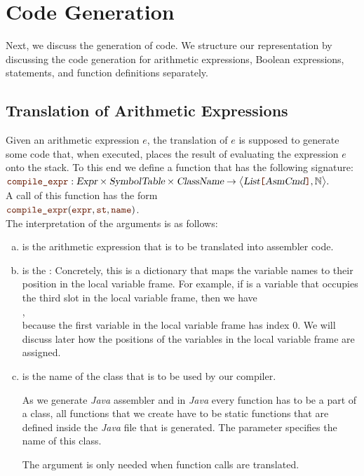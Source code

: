 \section{Code Generation}
Next, we discuss the generation of code.  We structure our representation by discussing the code generation for
arithmetic expressions, Boolean expressions, statements, and function definitions separately. 

\subsection{Translation of Arithmetic Expressions}
Given an arithmetic expression $e$, the translation of $e$ is supposed to generate some code that, when
executed, places the result of evaluating the expression $e$ onto the stack.  To this end we define a function
 that has the following signature:
\\[0.2cm]
\hspace*{1.3cm}
$\mytt{compile\_expr}: \textsl{Expr} \times \textsl{SymbolTable} \times \textsl{ClassName} \rightarrow 
                 \bigl\langle\textsl{List}\mytt{[}\textsl{AsmCmd}\mytt{]}, \mathbb{N}\bigr\rangle.$
\\[0.2cm]
A call of this function has the form
\\[0.2cm]
\hspace*{1.3cm}
$\mytt{compile\_expr}(\mytt{expr}, \mytt{st}, \mytt{name})$.
\\[0.2cm]
The interpretation of the arguments is as follows:
\begin{enumerate}[(a)]
\item {} is the arithmetic expression that is to be translated into assembler code.
\item {} is the :  Concretely, this is a dictionary that maps
      the variable names to their position in the local variable frame.  For example, if  is a
      variable that occupies the third slot in the local variable frame, then we have
      \\[0.2cm]
      \hspace*{1.3cm}
      ,
      \\[0.2cm]
      because the first variable in the local variable frame has index 0.  We will discuss later how the 
      positions of the variables in the local variable frame are assigned.
\item {} is the name of the class that is to be used by our compiler.

      As we generate \textsl{Java} assembler and in \textsl{Java} every function has to be a part of a class,
      all functions that we create have to be static functions that are defined inside the \textsl{Java}
       file that is generated.  The parameter  specifies the name of this class.

      The argument  is only needed when function calls are translated.
\end{enumerate}
